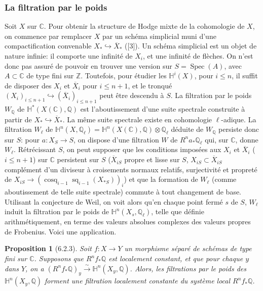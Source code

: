 \documentclass[12pt,a4paper]{article}
\theoremstyle{plain}
\newtheorem{proposition}[theorem]{Proposition}
\theoremstyle{definition}
\theoremstyle{remark}
\DeclareMathOperator{\Spec}{Spec}
\DeclareMathOperator{\cosq}{cosq}
\DeclareMathOperator{\sq}{sq}
\newcommand{\CC}{\mathbb{C}}
\newcommand{\HH}{\mathbb{H}}
\newcommand{\QQ}{\mathbb{Q}}
\newcommand{\ZZ}{\mathbb{Z}}
\begin{document}
\subsubsection{La filtration par le poids}

Soit $X$ sur $\CC$. Pour obtenir la structure de Hodge mixte de la cohomologie de $X$, on commence par remplacer $X$ par un sch\'ema simplicial muni d'une compactification convenable $X_* \hookrightarrow \overline{X}_*$ ([3]). Un sch\'ema simplicial est un objet de nature infinie: il comporte une infinit\'e de $X_i$, et une infinit\'e de fl\`eches. On n'est donc pas assur\'e de pouvoir en trouver une version sur $S = \Spec(A)$, avec $A \subset \CC$ de type fini sur $\ZZ$. Toutefois, pour \'etudier les $\HH^i(X)$, pour $i \leq n$, il suffit de disposer des $X_i$ et $\overline{X}_i$ pour $i \leq n+1$, et le tronqu\'e $(X_i)_{i \leq n+1} \hookrightarrow (\overline{X}_i)_{i \leq n+1}$ peut \^etre descendu \`a $S$. La filtration par le poids $W_{\QQ}$ de $\HH^*(X(\CC), \QQ)$ est l'aboutissement d'une suite spectrale construite \`a partir de $X_* \hookrightarrow \overline{X}_*$. La m\^eme suite spectrale existe en cohomologie $\ell$-adique. La filtration $W_{\ell}$ de $\HH^n(X, \QQ_{\ell}) = \HH^n(X(\CC), \QQ) \otimes \QQ_{\ell}$ d\'eduite de $W_{\QQ}$ persiste donc sur $S$: pour $a: X_S \to S$, on dispose d'une filtration $W$ de $R^na_*\QQ_{\ell}$ qui, sur $\CC$, donne $W_{\ell}$. R\'etr\'ecissant $S$, on peut supposer que les conditions impos\'ees aux $X_i$ et $\overline{X}_i$ ($i \leq n+1$) sur $\CC$ persistent sur $S$ ($\overline{X}_{iS}$ propre et lisse sur $S$, $X_{iS} \subset \overline{X}_{iS}$ compl\'ement d'un diviseur \`a croisements normaux relatifs, surjectivit\'e et propret\'e de $X_{iS} \to (\cosq_{i-1}\sq_{i-1}(X_{*S}))_i$) et que la formation de $W_{\ell}$ (comme aboutissement de telle suite spectrale) commute \`a tout changement de base. Utilisant la conjecture de Weil, on voit alors qu'en chaque point ferm\'e $s$ de $S$, $W_{\ell}$ induit la filtration par le poids de $\HH^n(X_s, \QQ_{\ell})$, telle que d\'efinie arithm\'etiquement, en terme des valeurs absolues complexes des valeurs propres de Frobenius. Voici une application.

\begin{proposition}[6.2.3]
Soit $f: X \to Y$ un morphisme s\'epar\'e de sch\'emas de type fini sur $\CC$. Supposons que $R^nf_*\QQ$ est localement constant, et que pour chaque $y$ dans $Y$, on a $(R^nf_*\QQ)_y \xrightarrow{\sim} \HH^n(X_y, \QQ)$. Alors, les filtrations par le poids des $\HH^n(X_y, \QQ)$ forment une filtration localement constante du syst\`eme local $R^nf_*\QQ$.
\end{proposition}
\end{document}
